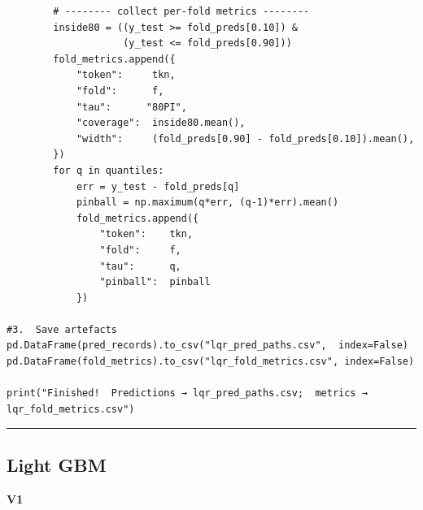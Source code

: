 \documentclass[
  a4paper,
  DIV=11,
  numbers=noendperiod]{scrreprt}
\begin{document}
\begin{verbatim}
        # -------- collect per-fold metrics --------
        inside80 = ((y_test >= fold_preds[0.10]) &
                    (y_test <= fold_preds[0.90]))
        fold_metrics.append({
            "token":     tkn,
            "fold":      f,
            "tau":      "80PI",
            "coverage":  inside80.mean(),
            "width":     (fold_preds[0.90] - fold_preds[0.10]).mean(),
        })
        for q in quantiles:
            err = y_test - fold_preds[q]
            pinball = np.maximum(q*err, (q-1)*err).mean()
            fold_metrics.append({
                "token":    tkn,
                "fold":     f,
                "tau":      q,
                "pinball":  pinball
            })

#3.  Save artefacts
pd.DataFrame(pred_records).to_csv("lqr_pred_paths.csv",  index=False)
pd.DataFrame(fold_metrics).to_csv("lqr_fold_metrics.csv", index=False)

print("Finished!  Predictions → lqr_pred_paths.csv;  metrics → lqr_fold_metrics.csv")
\end{verbatim}

\begin{center}\rule{0.5\linewidth}{0.5pt}\end{center}

\subsection{Light GBM}\label{light-gbm}

\textbf{V1}
\end{document}

